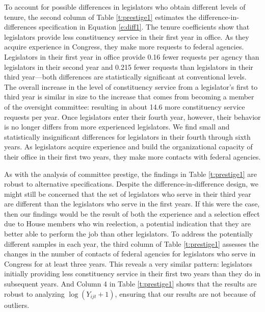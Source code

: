 \documentclass[12pt]{article}
\begin{document}
% 


To account for possible differences in legislators who obtain different levels of tenure, the second column of Table \ref{t:prestige1} estimates the difference-in-differences specification in Equation \ref{e:diff1}. The tenure coefficients show that legislators provide less constituency service in their first year in office. As they acquire experience in Congress, they make more requests to federal agencies. Legislators in their first year in office provide 0.16 fewer requests per agency than legislators in their second year and 0.215 fewer requests than legislators in their third year---both differences are statistically significant at conventional levels. The overall increase in the level of constituency service from a legislator's first to third year is similar in size to the increase that comes from becoming a member of the oversight committee: resulting in about 14.6 more constituency service requests per year. Once legislators enter their fourth year, however, their behavior is no longer differs from more experienced legislators. We find small and statistically insignificant differences for legislators in their fourth through sixth years. As legislators acquire experience and build the organizational capacity of their office in their first two years, they make more contacts with federal agencies.  

As with the analysis of committee prestige, the findings in Table \ref{t:prestige1} are robust to alternative specifications. Despite the difference-in-difference design, we might still be concerned that the set of legislators who serve in their third year are different than the legislators who serve in the first years. If this were the case, then our findings would be the result of both the experience and a selection effect due to House members who win reelection, a potential indication that they are better able to perform the job than other legislators. To address the potentially different samples in each year, the third column of Table \ref{t:prestige1} assesses the changes in the number of contacts of federal agencies for legislators who serve in Congress for at least three years. This reveals a very similar pattern: legislators initially providing less constituency service in their first two years than they do in subsequent years. And Column 4 in Table \ref{t:prestige1} shows that the results are robust to analyzing $\log(Y_{ijt} + 1)$, ensuring that our results are not because of outliers.  
\end{document}
